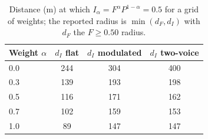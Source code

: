 \begin{table}[!ht]
\centering
\caption{Distance (m) at which $I_\alpha=F^{\alpha}P^{1-\alpha}=0.5$ for a grid of weights; the reported radius is $\min(d_F,d_I)$ with $d_F$ the $F\ge0.50$ radius.}
\label{tab:p4weights}
\small
\begin{tabular}{lccc}
\toprule
Weight $\alpha$ & $d_I$ flat & $d_I$ modulated & $d_I$ two-voice \\
\midrule
0.0 & 244 & 304 & 400 \\
0.3 & 139 & 193 & 198 \\
0.5 & 116 & 171 & 162 \\
0.7 & 102 & 159 & 153 \\
1.0 & 89 & 147 & 147 \\
\bottomrule
\end{tabular}
\end{table}